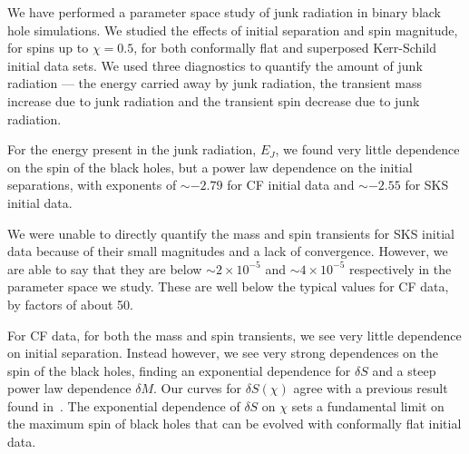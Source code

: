We have performed a parameter space study of junk radiation in binary
black hole simulations. We studied the effects of initial separation
and spin magnitude, for spins up to $\chi=0.5$, for both conformally flat and superposed
Kerr-Schild initial data sets. We used three diagnostics to quantify
the amount of junk radiation --- the energy carried away by junk
radiation, the transient mass increase
due to junk radiation and the
transient spin decrease
due to junk radiation.

For the energy present in the junk radiation, $E_J$, we found
very little dependence on the spin of the black holes, but a power law dependence on the initial separations, with exponents of
$\sim -2.79$ for CF initial data and $\sim -2.55$ for SKS initial
data.

We were unable to directly quantify the mass and spin transients for
SKS initial data because of their small magnitudes and a lack of convergence. However, we are
able to say that they are below $\sim 2\times10^{-5}$ and $\sim
4\times10^{-5}$ respectively in the parameter space we study. These
are well below the typical values for CF data, by factors of about 50.

For CF data, for both the mass and spin transients, we see very little
dependence on initial separation. Instead however, we see very strong
dependences on the spin of the black holes, finding an exponential
dependence for $\delta S$ and a steep power law dependence
$\delta M$. Our curves for $\delta S(\chi)$ agree with a previous result found in~\cite{Lovelace2008}. The exponential dependence of 
$\delta S$ on $\chi$ sets a
fundamental limit on the maximum spin of black holes that can be
evolved with conformally flat initial data.
